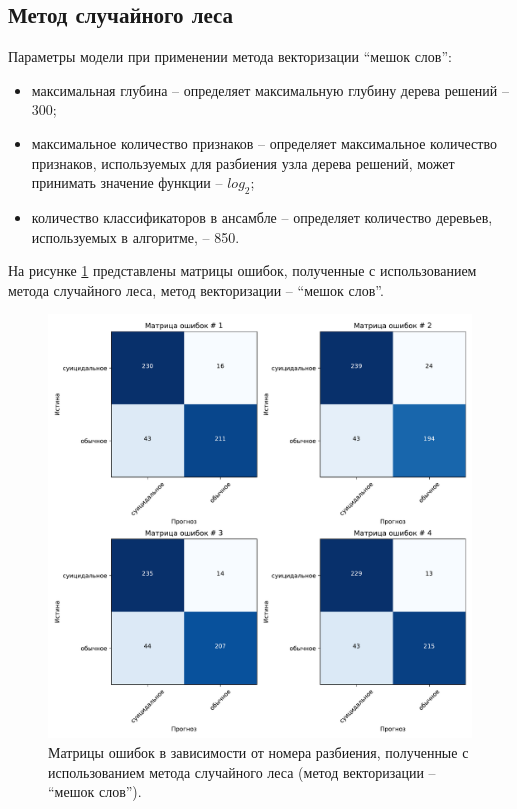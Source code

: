 \subsection{Метод случайного леса }

Параметры модели при применении метода векторизации ``мешок слов'':
\begin{itemize}
	\item максимальная глубина -- определяет максимальную глубину дерева решений -- 300;
	\item максимальное количество признаков -- определяет максимальное количество признаков, используемых для разбиения узла дерева решений, может принимать значение функции -- $log_2$;
	\item количество классификаторов в ансамбле -- определяет количество деревьев, используемых в алгоритме, -- 850.
\end{itemize}

На рисунке \ref{img:randomMatrBag} представлены матрицы ошибок, полученные с использованием метода случайного леса, метод векторизации -- ``мешок слов''.
\begin{figure}[H]
	\centering
	\includegraphics[width=\textwidth]{inc/plots/randomMatrBag.pdf}
	\caption{ Матрицы ошибок в зависимости от номера разбиения, полученные с использованием метода случайного леса (метод векторизации -- ``мешок слов''). }
	\label{img:randomMatrBag}
\end{figure}

